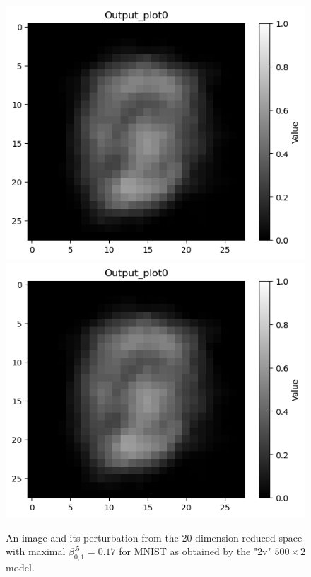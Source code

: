 \documentclass[letterpaper]{article} %
\begin{document}
\begin{figure}[t!]
	\centering
\includegraphics[scale=0.5]{redimage.png} \hspace{0.8cm}
\includegraphics[scale=0.5]{redperturb.png}
\caption{An image and its perturbation from the 20-dimension reduced space with maximal $\beta^{.5}_{0,1}=0.17$ for MNIST as obtained by the "2v" $500 \times 2$ model.}
\end{figure}	

	
	
\end{document}
